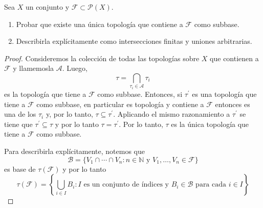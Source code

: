 \documentclass{article}
\theoremstyle{definition}
\newcommand{\N}{\mathbb{N}}
\newenvironment{ejercicio}[1]{\begin{trivlist}
\item[\hskip \labelsep {\bfseries Ejercicio}\hskip \labelsep {\bfseries #1.}]}{\end{trivlist}}
\begin{document}
\begin{ejercicio}{9}
    Sea \(X\) un conjunto y \(\mathcal{F}\subset\mathcal{P}(X)\).
    \begin{enumerate}
        \item Probar que existe una única topología que contiene a \(\mathcal{F}\) como subbase.
        \item Describirla explícitamente como intersecciones finitas y uniones arbitrarias.
    \end{enumerate}
\end{ejercicio}
\begin{proof}
    Consideremos la colección de todas las topologías sobre \( X \) que contienen a \( \mathcal{F} \) y llamemosla \( \mathcal{A} \). Luego, \[
        \tau = \bigcap_{\tau_i \in \mathcal{A}} \tau_i
    \]
    es la topología que tiene a \( \mathcal{F} \) como subbase. Entonces, si \( \tau^{\prime} \) es una topología que tiene a \( \mathcal{F} \) como subbase, en particular es topología y contiene a \( \mathcal{F} \) entonces es una de los \( \tau_i \) y, por lo tanto, \( \tau \subseteq \tau^{\prime} \). Aplicando el mismo razonamiento a \( \tau^{\prime} \) se tiene que \( \tau^{\prime} \subseteq \tau \) y por lo tanto \( \tau = \tau^{\prime} \). Por lo tanto, \( \tau \) es la única topología que tiene a \( \mathcal{F} \) como subbase.

    Para describirla explícitamente, notemos que \[
        \mathcal{B} = \{ V_1 \cap \cdots \cap V_n : n \in \N \text{ y } V_1, \ldots, V_n \in \mathcal{F} \}
    \]
    es base de \( \tau(\mathcal{F}) \) y por lo tanto \[
        \tau(\mathcal{F}) = \left \{ \bigcup_{i \in I} B_i : I \text{ es un conjunto de índices y } B_i \in \mathcal{B} \text{ para cada } i \in I \right \}
    \]
\end{proof}
\end{document}
